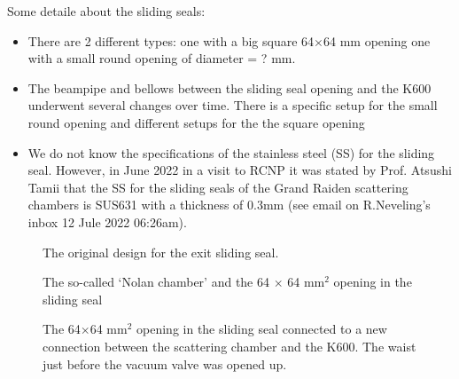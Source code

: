 \documentclass[11pt]{report}
\begin{document}
Some detaile about the sliding seals:
\begin{itemize}
\item There are 2 different types: one with a big square 64$\times$64 mm opening
one with a small round opening of diameter = ? mm.

\item The beampipe and bellows between the sliding seal opening and the 
K600 underwent several changes over time.
There is a specific setup for the small round opening
and different setups for the the square opening

\item We do not know the specifications of the stainless steel (SS) for the sliding seal. However, in June 2022 in a visit to RCNP it was stated by Prof. Atsushi Tamii that the SS for the sliding seals of the Grand Raiden scattering chambers is 
SUS631 with a thickness of 0.3mm (see email on R.Neveling's inbox 12 Jule 2022 06:26am).

\end{itemize}

\begin{figure}[!ht]
\centerline{\vspace{0cm}\hspace{0cm}
}
\centering
\caption{The original design for the exit sliding seal.}
\label{fig:scatchamber-exit-original}
\end{figure} 

\begin{figure}[!ht]
\centerline{\vspace{0cm}\hspace{0cm}
}
\centering
\caption{The so-called `Nolan chamber' and the 64 $\times$ 64 mm$^2$ opening in the sliding seal}
\label{fig:scatchamber-nolanchamber}
\end{figure} 


\begin{figure}[!ht]
\centerline{\vspace{0cm}\hspace{0cm}
}
\centering
\caption{The 64$\times$64 mm$^2$ opening in the sliding seal connected to a new connection 
between the scattering chamber and the K600. The waist just before the vacuum valve was opened up.  }
\label{fig:scatchamber-exit-new}
\end{figure} 
\end{document}
